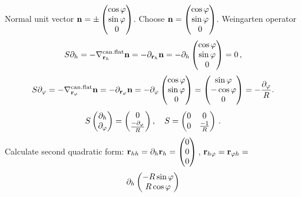 \documentclass[12pt]{article}
\theoremstyle{theorem}
\numberwithin{equation}{section}
\begin{document}
{   Normal unit vector $\n=\pm \begin{pmatrix}
        \cos \varphi\cr
        \sin\varphi\cr
        0\cr
   \end{pmatrix}$. Choose $\n=\begin{pmatrix}
        \cos \varphi\cr
        \sin\varphi\cr
        0\cr
   \end{pmatrix}$. Weingarten operator
     \begin{equation*}\label{weingrartenforcylinder}
        S\partial_h=-\nabla^{\rm can.flat}_{{\bf r}_h}{\bf n}=-\partial_{{\bf r}_h} {\bf n}=-\partial_h\begin{pmatrix}
        \cos \varphi\cr
        \sin\varphi\cr
        0\cr
   \end{pmatrix}=0\,,
     \end{equation*}
\begin{equation*}\label{weingrartenforcylinder}
        S\partial_\varphi=-\nabla^{\rm can.flat}_{{\bf r}_\varphi}{\bf n}=-\partial_{{\bf r}_\varphi} {\bf n}=-{\partial_\varphi}
        \begin{pmatrix}
        \cos \varphi\cr
        \sin\varphi\cr
        0\cr
   \end{pmatrix}=\begin{pmatrix}
        \sin\varphi \cr
        -\cos\varphi\cr
        0\cr
   \end{pmatrix}=-{\partial_\varphi\over R}.
    \end{equation*}
\begin{equation}\label{weingrartenforcylinder2}
           S
   \begin{pmatrix}
        \partial_h \cr
        \partial_\varphi\cr
   \end{pmatrix}=
   \begin{pmatrix}
         0\cr
        {-\partial_\varphi\over R}\cr
   \end{pmatrix},\quad S=\begin{pmatrix}0&0\cr 0 &{-1\over R}\end{pmatrix}\,.
    \end{equation}
Calculate   second quadratic form:  $\r_{hh}=\p_h\r_h=
  \begin{pmatrix}
        0\\
        0\\
        0\\
   \end{pmatrix}\,$, $\r_{h\varphi}=\r_{\varphi h}=$
             $$
             \p_h
       \begin{pmatrix}
        -R\sin\varphi\\
        R\cos\varphi\\

\end{pmatrix}$$}
\end{document}
